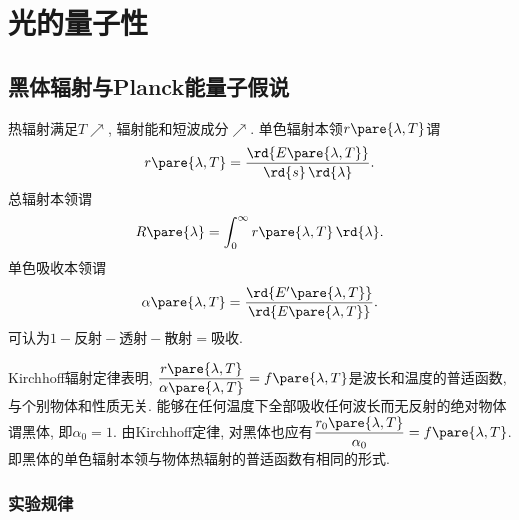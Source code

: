 \documentclass{ctexart}
\begin{document}
\section{光的量子性} %
\label{sec:光的量子性}

\subsection{黑体辐射与Planck能量子假说} %
\label{sub:黑体辐射与planck能量子假说}

热辐射满足$T\nearrow$, 辐射能和短波成分$\nearrow$. 单色辐射本领$r\pare{\lambda,T}$谓
\[ r\pare{\lambda,T} = \frac{\rd{E\pare{\lambda,T}}}{\rd{s}\,\rd{\lambda}}. \]
总辐射本领谓
\[ R\pare{\lambda} = \int_0^\infty r\pare{\lambda,T}\,\rd{\lambda}. \]
单色吸收本领谓
\[ \alpha\pare{\lambda,T} = \frac{\rd{E'\pare{\lambda,T}}}{\rd{E\pare{\lambda,T}}}. \]
可认为$1-\text{反射} - \text{透射} - \text{散射} = \text{吸收}$.
\par
Kirchhoff辐射定律表明, $\displaystyle \frac{r\pare{\lambda,T}}{\alpha\pare{\lambda,T}} = f\pare{\lambda,T}$是波长和温度的普适函数, 与个别物体和性质无关. 能够在任何温度下全部吸收任何波长而无反射的绝对物体谓黑体, 即$\alpha_0 = 1$. 由Kirchhoff定律, 对黑体也应有$\displaystyle \frac{r_0\pare{\lambda,T}}{\alpha_0} = f\pare{\lambda,T}$. 即黑体的单色辐射本领与物体热辐射的普适函数有相同的形式.

\subsubsection{实验规律} %
\label{ssub:实验规律}
\end{document}
